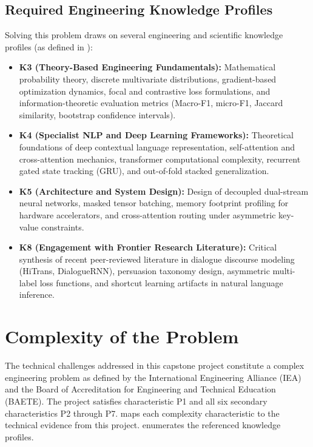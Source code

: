 \subsection{Required Engineering Knowledge Profiles}
Solving this problem draws on several engineering and scientific knowledge profiles (as defined in ):
\begin{itemize}
  \item \textbf{K3 (Theory-Based Engineering Fundamentals):} Mathematical probability theory, discrete multivariate distributions, gradient-based optimization dynamics, focal and contrastive loss formulations, and information-theoretic evaluation metrics (Macro-F1, micro-F1, Jaccard similarity, bootstrap confidence intervals).
  \item \textbf{K4 (Specialist NLP and Deep Learning Frameworks):} Theoretical foundations of deep contextual language representation, self-attention and cross-attention mechanics, transformer computational complexity, recurrent gated state tracking (GRU), and out-of-fold stacked generalization.
  \item \textbf{K5 (Architecture and System Design):} Design of decoupled dual-stream neural networks, masked tensor batching, memory footprint profiling for hardware accelerators, and cross-attention routing under asymmetric key-value constraints.
  \item \textbf{K8 (Engagement with Frontier Research Literature):} Critical synthesis of recent peer-reviewed literature in dialogue discourse modeling (HiTrans, DialogueRNN), persuasion taxonomy design, asymmetric multi-label loss functions, and shortcut learning artifacts in natural language inference.
\end{itemize}

\section{Complexity of the Problem}
\label{sec:complexity}

The technical challenges addressed in this capstone project constitute a complex engineering problem as defined by the International Engineering Alliance (IEA) and the Board of Accreditation for Engineering and Technical Education (BAETE). The project satisfies characteristic P1 and all six secondary characteristics P2 through P7.  maps each complexity characteristic to the technical evidence from this project.  enumerates the referenced knowledge profiles.

